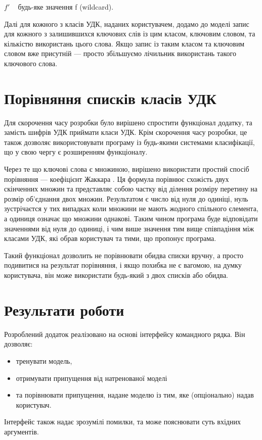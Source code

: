 \documentclass{article}
\let\oldsection\section
\renewcommand{\section}{\clearpage\oldsection}
\begin{document}
  $f'$ \textemdash~ будь-яке значення f (wildcard).

  Далі для кожного з класів УДК, наданих користувачем,
  додамо до моделі запис для кожного з залишившихся ключових слів із цим класом,
  ключовим словом, та кількістю використань цього слова.
  Якщо запис із таким класом та ключовим словом вже присутній ---
  просто збільшуємо лічильник використань такого ключового слова.

\section{Порівняння списків класів УДК}
Для скорочення часу розробки було вирішено спростити функціонал додатку,
  та замість шифрів УДК приймати класи УДК.
  Крім скорочення часу розробки, це також дозволяє використовувати програму
  із будь-якими системами класифікації,
  що у свою чергу є розширенням функціоналу.

  Через те що ключові слова є множиною, вирішено використати простий спосіб
  порівняння --- коефіцієнт Жаккара .
  Ця формула порівнює схожість двух скінченних множин та представляє собою
  частку від ділення розміру перетину 
  на розмір об'єднання  двох множин.
  Результатом є число від нуля до одиніці, нуль зустрічаєтся
  у тих випадках коли множини не мають жодного спільного єлемента,
  а одиниця означає що множини однакові.
  Таким чином програма буде відповідати значеннями від нуля до одиниці,
  і чим више значення тим вище співпадіння між класами УДК,
  які обрав користувач та тими, що пропонує програма.

  Такий функціонал дозволить не порівнювати обидва списки вручну,
  а просто подивитися на результат порівняння, і якщо похибка не є вагомою,
  на думку користувача, він може використати будь-який з двох списків або обидва.

\section{Результати роботи}
Розроблений додаток реалізовано на основі інтерфейсу командного рядка.
Він дозволяє:
\begin{itemize}
  \item тренувати модель,
  \item отримувати припущення від натренованої моделі
  \item та порівнювати припущення, надане моделю із тим, яке (опціонально) надав користувач.
\end{itemize}
Інтерфейс також надає зрозумілі помилки, та може пояснювати суть вхідних аргументів.
\end{document}
